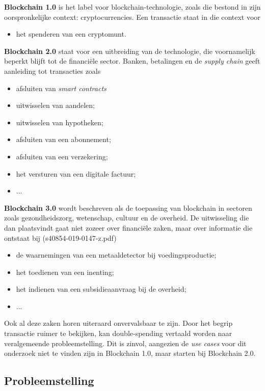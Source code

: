 \textbf{Blockchain 1.0} is het label voor blockchain-technologie, zoals die bestond in zijn oorspronkelijke context: cryptocurrencies. Een transactie staat in die context voor
\begin{itemize}
	\item het spenderen van een cryptomunt.
\end{itemize}
\textbf{Blockchain 2.0} staat voor een uitbreiding van de technologie, die voornamelijk beperkt blijft tot de financiële sector. Banken, betalingen en de \textit{supply chain} geeft aanleiding tot transacties zoals
\begin{itemize}
	\item afsluiten van \textit{smart contracts}
	\item uitwisselen van aandelen;
	\item uitwisselen van hypotheken;
	\item afsluiten van een abonnement;
	\item afsluiten van een verzekering;
	\item het versturen van een digitale factuur;
	\item ...
\end{itemize}
\textbf{Blockchain 3.0} wordt beschreven als de toepassing van blockchain in sectoren zoals gezondheidszorg, wetenschap, cultuur en de overheid. De uitwisseling die dan plaatsvindt gaat niet zozeer over financiële zaken, maar over informatie die ontstaat bij (s40854-019-0147-z.pdf)
\begin{itemize}
	\item de waarnemingen van een metaaldetector bij voedingsproductie;
	\item het toedienen van een inenting;
	\item het indienen van een subsidieaanvraag bij de overheid;
	\item ...
\end{itemize}

Ook al deze zaken horen uiteraard onvervalsbaar te zijn. Door het begrip transactie ruimer te bekijken, kan double-spending vertaald worden naar veralgemeende probleemstelling. Dit is zinvol, aangezien de \textit{use cases} voor dit onderzoek niet te vinden zijn in Blockchain 1.0, maar starten bij Blockchain 2.0.


\subsection{Probleemstelling}
\label{sub:casus}

